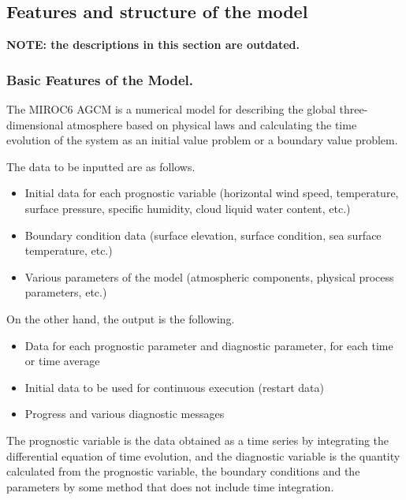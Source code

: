 \hypertarget{features-and-structure-of-the-model}{%
\subsection{Features and structure of the
model}\label{features-and-structure-of-the-model}}

\textbf{NOTE: the descriptions in this section are outdated.}

\hypertarget{basic-features-of-the-model.}{%
\subsubsection{Basic Features of the
Model.}\label{basic-features-of-the-model.}}

The MIROC6 AGCM is a numerical model for describing the global
three-dimensional atmosphere based on physical laws and calculating the
time evolution of the system as an initial value problem or a boundary
value problem.

The data to be inputted are as follows.

\begin{itemize}
\item
  Initial data for each prognostic variable (horizontal wind speed,
  temperature, surface pressure, specific humidity, cloud liquid water
  content, etc.)
\item
  Boundary condition data (surface elevation, surface condition, sea
  surface temperature, etc.)
\item
  Various parameters of the model (atmospheric components, physical
  process parameters, etc.)
\end{itemize}

On the other hand, the output is the following.

\begin{itemize}
\item
  Data for each prognostic parameter and diagnostic parameter, for each
  time or time average
\item
  Initial data to be used for continuous execution (restart data)
\item
  Progress and various diagnostic messages
\end{itemize}

The prognostic variable is the data obtained as a time series by
integrating the differential equation of time evolution, and the
diagnostic variable is the quantity calculated from the prognostic
variable, the boundary conditions and the parameters by some method that
does not include time integration.

